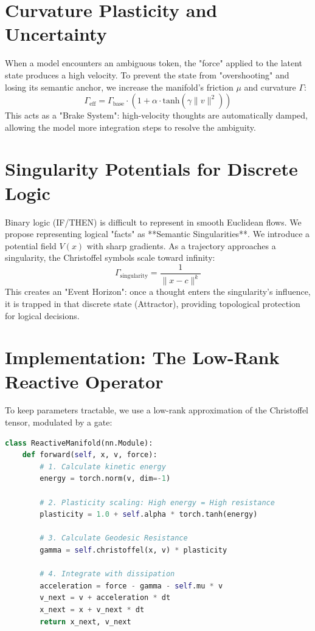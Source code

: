 \documentclass[11pt,a4paper]{report}
\begin{document}
\section{Curvature Plasticity and Uncertainty}
When a model encounters an ambiguous token, the "force" applied to the latent state produces a high velocity. To prevent the state from "overshooting" and losing its semantic anchor, we increase the manifold's friction $\mu$ and curvature $\Gamma$:
\begin{equation}
    \Gamma_{\text{eff}} = \Gamma_{\text{base}} \cdot (1 + \alpha \cdot \text{tanh}(\gamma \|v\|^2))
\end{equation}
This acts as a "Brake System": high-velocity thoughts are automatically damped, allowing the model more integration steps to resolve the ambiguity.

\section{Singularity Potentials for Discrete Logic}
Binary logic (IF/THEN) is difficult to represent in smooth Euclidean flows. We propose representing logical "facts" as **Semantic Singularities**. We introduce a potential field $V(x)$ with sharp gradients. As a trajectory approaches a singularity, the Christoffel symbols scale toward infinity:
\begin{equation}
    \Gamma_{\text{singularity}} = \frac{1}{\|x - c\|^k}
\end{equation}
This creates an "Event Horizon": once a thought enters the singularity's influence, it is trapped in that discrete state (Attractor), providing topological protection for logical decisions.

\section{Implementation: The Low-Rank Reactive Operator}
To keep parameters tractable, we use a low-rank approximation of the Christoffel tensor, modulated by a gate:
\begin{lstlisting}[language=Python]
class ReactiveManifold(nn.Module):
    def forward(self, x, v, force):
        # 1. Calculate kinetic energy
        energy = torch.norm(v, dim=-1)
        
        # 2. Plasticity scaling: High energy = High resistance
        plasticity = 1.0 + self.alpha * torch.tanh(energy)
        
        # 3. Calculate Geodesic Resistance
        gamma = self.christoffel(x, v) * plasticity
        
        # 4. Integrate with dissipation
        acceleration = force - gamma - self.mu * v
        v_next = v + acceleration * dt
        x_next = x + v_next * dt
        return x_next, v_next
\end{lstlisting}
\end{document}
